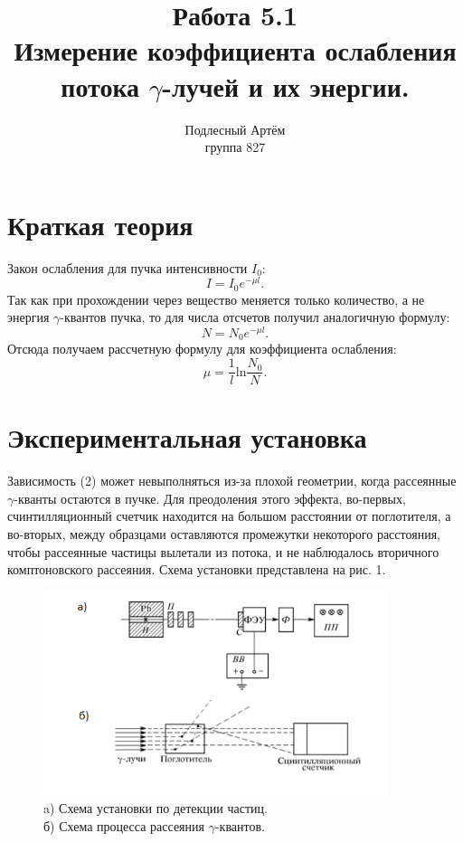 \documentclass[a4paper, 14pt]{extarticle}%
\author{Подлесный Артём \\ группа 827}
\title{Работа 5.1 \\ Измерение коэффициента ослабления потока $\gamma$-лучей и их энергии.}
\newcommand\ECaption[1]{%
     \captionsetup{font=footnotesize}%
     \caption{#1}}
\begin{document}
\maketitle

\section*{Краткая теория}
Закон ослабления для пучка интенсивности $I_0$:
\begin{equation}
I = I_0 e^{-\mu l}.
\end{equation}
Так как при прохождении через вещество меняется только количество, а не энергия $\gamma$-квантов пучка, то для числа отсчетов получил аналогичную формулу:
\begin{equation}
N = N_0 e^{-\mu l}.
\end{equation}
Отсюда получаем рассчетную формулу для коэффициента ослабления:
\begin{equation}
\mu  = \frac{1}{l} \text{ln}\frac{N_0}{N}.
\end{equation}

\section*{Экспериментальная установка}

Зависимость (2) может невыполняться из-за плохой геометрии, когда рассеянные $\gamma$-кванты остаются в пучке. Для преодоления этого эффекта, во-первых, счинтилляционный счетчик находится на большом расстоянии от поглотителя, а во-вторых, между образцами оставляются промежутки некоторого расстояния, чтобы рассеянные частицы вылетали из потока, и не наблюдалось вторичного комптоновского рассеяния. Схема установки представлена на рис. 1. 

\begin{figure}[h]
\begin{center}
\includegraphics[width=0.9\textwidth]{ust}
\end{center}
\ECaption{a) Схема установки по детекции частиц. \\ б) Схема процесса рассеяния $\gamma$-квантов.}
\end{figure}
\end{document}
